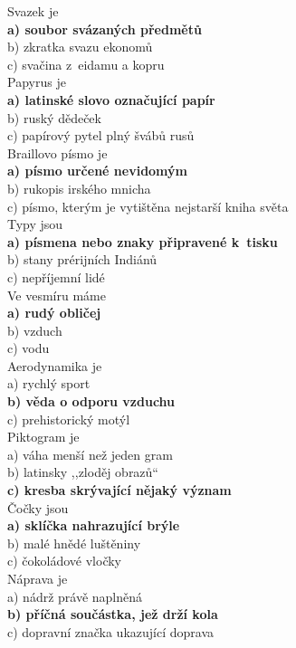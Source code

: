 \begin{multicols}{\value{columnsthindata}}
\noindent
Svazek je\\
\textbf{a) soubor svázaných předmětů}\\
b) zkratka svazu ekonomů\\
c) svačina z~eidamu a kopru\\

\noindent
Papyrus je\\
\textbf{a) latinské slovo označující papír}\\
b) ruský dědeček\\
c) papírový pytel plný švábů rusů\\

\noindent
Braillovo písmo je\\
\textbf{a) písmo určené nevidomým}\\
b) rukopis irského mnicha\\
c) písmo, kterým je vytištěna nejstarší kniha světa\\

\noindent
Typy jsou\\
\textbf{a) písmena nebo znaky připravené k~tisku}\\
b) stany prérijních Indiánů\\
c) nepříjemní lidé\\

\noindent
Ve vesmíru máme\\
\textbf{a) rudý obličej}\\
b) vzduch\\
c) vodu\\

\noindent
Aerodynamika je\\
a) rychlý sport\\
\textbf{b) věda o odporu vzduchu}\\
c) prehistorický motýl\\

\noindent
Piktogram je\\
a) váha menší než jeden gram\\
b) latinsky ,,zloděj obrazů``\\
\textbf{c) kresba skrývající nějaký význam}\\

\noindent
Čočky jsou\\
\textbf{a) sklíčka nahrazující brýle}\\
b) malé hnědé luštěniny\\
c) čokoládové vločky\\

\noindent
Náprava je\\
a) nádrž právě naplněná\\
\textbf{b) příčná součástka, jež drží kola}\\
c) dopravní značka ukazující doprava\\


\end{multicols}
